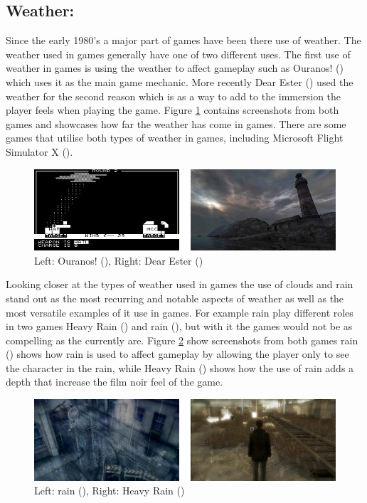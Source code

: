 \subsection{Weather:}
\label{sec:weather}
Since the early 1980's a major part of games have been there use of weather.
The weather used in games generally have one of two different uses.
The first use of weather in games is using the weather to affect gameplay such as Ouranos! (\citeyear{Ouranos80}) which uses it as the main game mechanic.
More recently Dear Ester (\citeyear{DearEsther12}) used the weather for the second reason which is as a way to add to the immersion the player feels when playing the game.
Figure \ref{fig:de_o} contains screenshots from both games and showcases how far the weather has come in games.
There are some games that utilise both types of weather in games, including Microsoft Flight Simulator X (\citeyear{MFS03}). 


\begin{figure}[ht!]
	\centering
	\includegraphics[width=\textwidth]{images/dear_esther.PNG}
	\caption{Left: Ouranos! (\citeyear{Ouranos80}), Right: Dear Ester (\citeyear{DearEsther12})}
	\label{fig:de_o}
\end{figure}


Looking closer at the types of weather used in games the use of clouds and rain stand out as the most recurring and notable aspects of weather as well as the most versatile examples of it use in games.
For example rain play different roles in two games Heavy Rain (\citeyear{HeavyRain10}) and rain (\citeyear{rain13}), but with it the games would not be as compelling as the currently are.
Figure \ref{fig:rain_heavy_rain} show screenshots from both games rain (\citeyear{rain13}) shows how rain is used to affect gameplay by allowing the player only to see the character in the rain, while Heavy Rain (\citeyear{HeavyRain10}) shows how the use of rain adds a depth that increase the film noir feel of the game.


\begin{figure}[ht!]
	\centering
	\includegraphics[width=\textwidth]{images/rain_heavy_rain.PNG}
	\caption{Left: rain (\citeyear{rain13}), Right: Heavy Rain (\citeyear{HeavyRain10})}
	\label{fig:rain_heavy_rain}
\end{figure}


